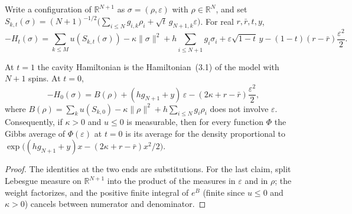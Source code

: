 \begin{definition}\label{def:sg-tal:st-cavity}
  \leanok
{}
Write a configuration of $\mathbb R^{N+1}$ as $\sigma=(\rho,\varepsilon)$ with $\rho\in\mathbb R^N$, and set
$S_{k,t}(\sigma)=(N+1)^{-1/2}\bigl(\sum_{i\le N}g_{i,k}\rho_i+\sqrt t\,g_{N+1,k}\varepsilon\bigr)$. For real $r,
\bar r,t,y$,
\[
-H_t(\sigma)=\sum_{k\le M}u(S_{k,t}(\sigma))-\kappa\|\sigma\|^2+h\sum_{i\le N+1}g_i\sigma_i
+\varepsilon\sqrt{1-t}\,y-(1-t)(r-\bar r)\frac{\varepsilon^2}2 .
\]
\end{definition}

\begin{lemma}\label{lem:sg-tal:st-cavity-ends}
  \leanok
At $t=1$ the cavity Hamiltonian is the Hamiltonian~(3.1) of the model with $N+1$ spins. At $t=0$,
\[
-H_0(\sigma)=B(\rho)+(hg_{N+1}+y)\,\varepsilon-(2\kappa+r-\bar r)\frac{\varepsilon^2}2,
\]
where $B(\rho)=\sum_ku(S_{k,0})-\kappa\|\rho\|^2+h\sum_{i\le N}g_i\rho_i$ does not involve $\varepsilon$.
Consequently, if $\kappa>0$ and $u\le0$ is measurable, then for every function $\Phi$ the Gibbs average of
$\Phi(\varepsilon)$ at $t=0$ is its average for the density proportional to
$\exp\bigl((hg_{N+1}+y)x-(2\kappa+r-\bar r)x^2/2\bigr)$.
\end{lemma}
\begin{proof}
  \leanok
The identities at the two ends are substitutions. For the last claim, split Lebesgue measure on
$\mathbb R^{N+1}$ into the product of the measures in $\varepsilon$ and in $\rho$; the weight factorizes, and the
positive finite integral of $e^{B}$ (finite since $u\le0$ and $\kappa>0$) cancels between numerator and
denominator.
\end{proof}

